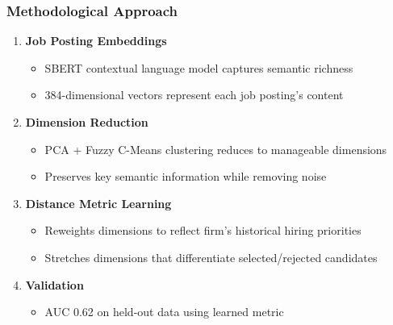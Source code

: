 \documentclass[aspectratio=169]{beamer}
\begin{document}
\begin{frame}
\frametitle{Methodological Approach}

\begin{enumerate}
\item \textbf{Job Posting Embeddings}
   \begin{itemize}
   \item SBERT contextual language model captures semantic richness
   \item 384-dimensional vectors represent each job posting's content
   \end{itemize}
\vspace{0.5em}

\item \textbf{Dimension Reduction}
   \begin{itemize}
   \item PCA + Fuzzy C-Means clustering reduces to manageable dimensions
   \item Preserves key semantic information while removing noise
   \end{itemize}
\vspace{0.5em}

\item \textbf{Distance Metric Learning}
   \begin{itemize}
   \item Reweights dimensions to reflect firm's historical hiring priorities
   \item Stretches dimensions that differentiate selected/rejected candidates
   \end{itemize}
\vspace{0.5em}

\item \textbf{Validation}
   \begin{itemize}
   \item AUC 0.62 on held-out data using learned metric
   \end{itemize}
\end{enumerate}
\end{frame}
\end{document}
